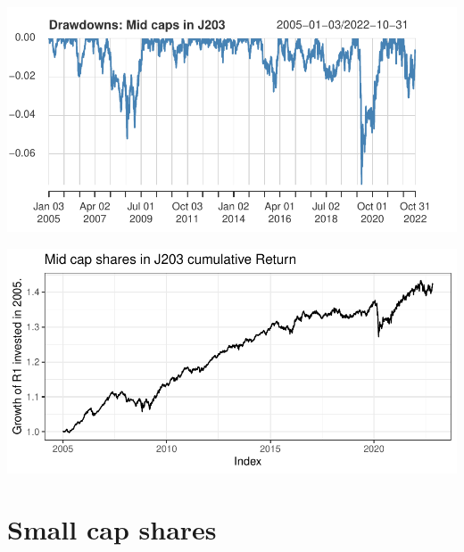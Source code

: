 \documentclass[11pt,preprint, authoryear]{elsarticle}
\let\origfigure\figure
\let\endorigfigure\endfigure
\renewenvironment{figure}[1][2] {
    \expandafter\origfigure\expandafter[H]
} {
    \endorigfigure
}
\numberwithin{equation}{section}
\numberwithin{figure}{section}
\numberwithin{table}{section}
\begin{document}
\begin{figure}[H]

{\centering \includegraphics{Volatility-of-Shares_files/figure-latex/Figure5-1} 

}

\caption{Caption Here \label{Figure5}}\label{fig:Figure5}
\end{figure}

\begin{figure}[H]

{\centering \includegraphics{Volatility-of-Shares_files/figure-latex/Figure6-1} 

}

\caption{Caption Here \label{Figure6}}\label{fig:Figure6}
\end{figure}

\hypertarget{small-cap-shares}{%
\section{\texorpdfstring{Small cap shares
\label{Small}}{Small cap shares }}\label{small-cap-shares}}
\end{document}
